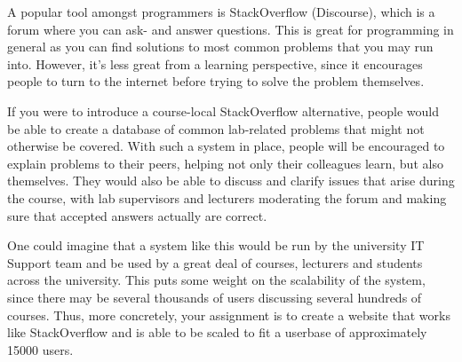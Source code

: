 A popular tool amongst programmers is StackOverflow (Discourse), which is a forum where you can ask- and answer questions. This is great for programming in general as you can find solutions to most common problems that you may run into. However, it's less great from a learning perspective, since it encourages people to turn to the internet before trying to solve the problem themselves.

If you were to introduce a course-local StackOverflow alternative, people would be able to create a database of common lab-related problems that might not otherwise be covered. With such a system in place, people will be encouraged to explain problems to their peers, helping not only their colleagues learn, but also themselves. They would also be able to discuss and clarify issues that arise during the course, with lab supervisors and lecturers moderating the forum and making sure that accepted answers actually are correct.

One could imagine that a system like this would be run by the university IT Support team and be used by a great deal of courses, lecturers and students across the university. This puts some weight on the scalability of the system, since there may be several thousands of users discussing several hundreds of courses. Thus, more concretely, your assignment is to create a website that works like StackOverflow and is able to be scaled to fit a userbase of approximately 15000 users.
